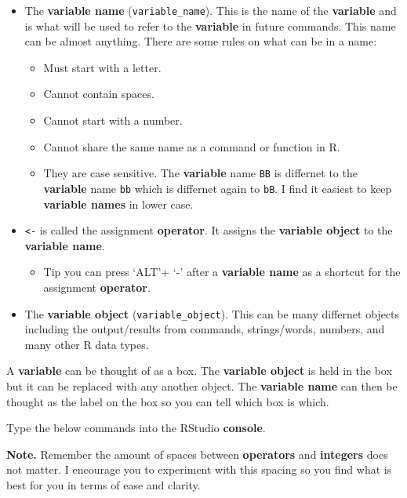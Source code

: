 \documentclass[]{book}
\providecommand{\tightlist}{%
  \setlength{\itemsep}{0pt}\setlength{\parskip}{0pt}}
\begin{document}
\begin{itemize}
\tightlist
\item
  The \textbf{variable name} (\texttt{variable\_name}). This is the name
  of the \textbf{variable} and is what will be used to refer to the
  \textbf{variable} in future commands. This name can be almost
  anything. There are some rules on what can be in a name:

  \begin{itemize}
  \tightlist
  \item
    Must start with a letter.
  \item
    Cannot contain spaces.
  \item
    Cannot start with a number.
  \item
    Cannot share the same name as a command or function in R.
  \item
    They are case sensitive. The \textbf{variable} name \texttt{BB} is
    differnet to the \textbf{variable} name \texttt{bb} which is
    differnet again to \texttt{bB}. I find it easiest to keep
    \textbf{variable names} in lower case.
  \end{itemize}
\item
  \texttt{\textless{}-} is called the assignment \textbf{operator}. It
  assigns the \textbf{variable object} to the \textbf{variable name}.

  \begin{itemize}
  \tightlist
  \item
    Tip you can press `ALT'+ `-' after a \textbf{variable name} as a
    shortcut for the assignment \textbf{operator}.
  \end{itemize}
\item
  The \textbf{variable object} (\texttt{variable\_object}). This can be
  many differnet objects including the output/results from commands,
  strings/words, numbers, and many other R data types.
\end{itemize}

A \textbf{variable} can be thought of as a box. The \textbf{variable
object} is held in the box but it can be replaced with any another
object. The \textbf{variable name} can then be thought as the label on
the box so you can tell which box is which.

Type the below commands into the RStudio \textbf{console}.

\textbf{Note.} Remember the amount of spaces between \textbf{operators}
and \textbf{integers} does not matter. I encourage you to experiment
with this spacing so you find what is best for you in terms of ease and
clarity.
\end{document}
